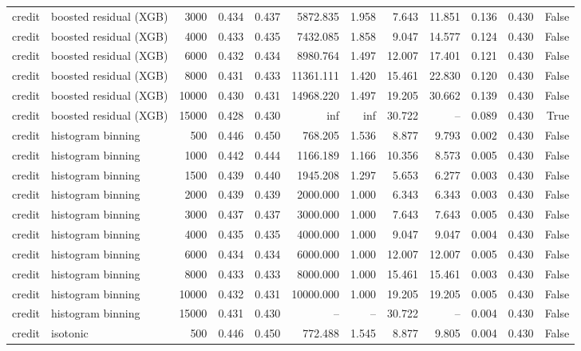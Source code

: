 \begin{tabular}{llrrrrrrrrrr}
credit & boosted residual (XGB) & 3000 & 0.434 & 0.437 & 5872.835 & 1.958 & 7.643 & 11.851 & 0.136 & 0.430 & False \\
credit & boosted residual (XGB) & 4000 & 0.433 & 0.435 & 7432.085 & 1.858 & 9.047 & 14.577 & 0.124 & 0.430 & False \\
credit & boosted residual (XGB) & 6000 & 0.432 & 0.434 & 8980.764 & 1.497 & 12.007 & 17.401 & 0.121 & 0.430 & False \\
credit & boosted residual (XGB) & 8000 & 0.431 & 0.433 & 11361.111 & 1.420 & 15.461 & 22.830 & 0.120 & 0.430 & False \\
credit & boosted residual (XGB) & 10000 & 0.430 & 0.431 & 14968.220 & 1.497 & 19.205 & 30.662 & 0.139 & 0.430 & False \\
credit & boosted residual (XGB) & 15000 & 0.428 & 0.430 & inf & inf & 30.722 & -- & 0.089 & 0.430 & True \\
credit & histogram binning & 500 & 0.446 & 0.450 & 768.205 & 1.536 & 8.877 & 9.793 & 0.002 & 0.430 & False \\
credit & histogram binning & 1000 & 0.442 & 0.444 & 1166.189 & 1.166 & 10.356 & 8.573 & 0.005 & 0.430 & False \\
credit & histogram binning & 1500 & 0.439 & 0.440 & 1945.208 & 1.297 & 5.653 & 6.277 & 0.003 & 0.430 & False \\
credit & histogram binning & 2000 & 0.439 & 0.439 & 2000.000 & 1.000 & 6.343 & 6.343 & 0.003 & 0.430 & False \\
credit & histogram binning & 3000 & 0.437 & 0.437 & 3000.000 & 1.000 & 7.643 & 7.643 & 0.005 & 0.430 & False \\
credit & histogram binning & 4000 & 0.435 & 0.435 & 4000.000 & 1.000 & 9.047 & 9.047 & 0.004 & 0.430 & False \\
credit & histogram binning & 6000 & 0.434 & 0.434 & 6000.000 & 1.000 & 12.007 & 12.007 & 0.005 & 0.430 & False \\
credit & histogram binning & 8000 & 0.433 & 0.433 & 8000.000 & 1.000 & 15.461 & 15.461 & 0.003 & 0.430 & False \\
credit & histogram binning & 10000 & 0.432 & 0.431 & 10000.000 & 1.000 & 19.205 & 19.205 & 0.005 & 0.430 & False \\
credit & histogram binning & 15000 & 0.431 & 0.430 & -- & -- & 30.722 & -- & 0.004 & 0.430 & False \\
credit & isotonic & 500 & 0.446 & 0.450 & 772.488 & 1.545 & 8.877 & 9.805 & 0.004 & 0.430 & False \\

\end{tabular}
